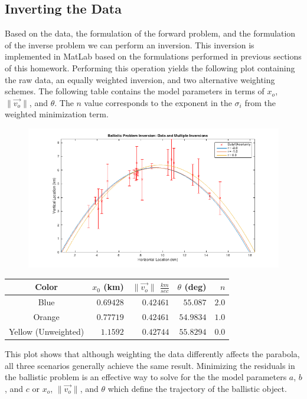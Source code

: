 \documentclass[12pt,runningheads]{article}
\begin{document}
\subsection*{Inverting the Data}
Based on the data, the formulation of the forward problem, and the formulation of the inverse problem we can perform an inversion. This inversion is implemented in MatLab based on the formulations performed in previous sections of this homework. Performing this operation yields the following plot containing the raw data, an equally weighted inversion, and two alternative weighting schemes. The following table contains the model parameters in terms of $x_{o}$, $\|\vec{v_{o}}\|$, and $\theta$. The $n$ value corresponds to the exponent in the $\sigma_{i}$ from the weighted minimization term.
\begin{figure}[!h]
\includegraphics[width=\textwidth]{Ballistic.png}
\end{figure}
\begin{center}
\begin{tabular}{|c|rrrr|}
\hline
Color & $x_{0}$ (km) & $\|\vec{v_{o}}\|$ $\frac{km}{sec}$ & $\theta$ (deg) & $n$ \\
\hline
\rule{0pt}{3ex} Blue & $0.69428$ & $0.42461$ & $55.087$ & $2.0$ \\
Orange & $0.77719$ & $0.42461$ & $54.9834$ & $1.0$ \\
Yellow (Unweighted) & $1.1592$ & $0.42744$ & $55.8294$ & $0.0$ \\
\hline
\end{tabular}
\end{center}
This plot shows that although weighting the data differently affects the parabola, all three scenarios generally achieve the same result. Minimizing the residuals in the ballistic problem is an effective way to solve for the the model parameters $a$, $b$, and $c$ or $x_{o}$, $\|\vec{v_{o}}\|$, and $\theta$ which define the trajectory of the ballistic object.
\end{document}
